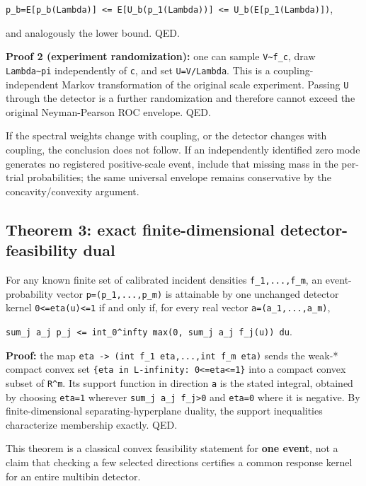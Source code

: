 \documentclass[
  10pt,
  a4paper,
]{article}
\begin{document}
\texttt{p\_b=E{[}p\_b(Lambda){]}\ \textless{}=\ E{[}U\_b(p\_1(Lambda)){]}\ \textless{}=\ U\_b(E{[}p\_1(Lambda){]})},

and analogously the lower bound. QED.

\textbf{Proof 2 (experiment randomization):} one can sample \texttt{V\textasciitilde{}f\_c}, draw \texttt{Lambda\textasciitilde{}pi} independently of \texttt{c}, and set \texttt{U=V/Lambda}. This is a coupling-independent Markov transformation of the original scale experiment. Passing \texttt{U} through the detector is a further randomization and therefore cannot exceed the original Neyman-Pearson ROC envelope. QED.

If the spectral weights change with coupling, or the detector changes with coupling, the conclusion does not follow. If an independently identified zero mode generates no registered positive-scale event, include that missing mass in the per-trial probabilities; the same universal envelope remains conservative by the concavity/convexity argument.

\subsection{Theorem 3: exact finite-dimensional detector-feasibility dual}\label{theorem-3-exact-finite-dimensional-detector-feasibility-dual}

For any known finite set of calibrated incident densities \texttt{f\_1,...,f\_m}, an event-probability vector \texttt{p=(p\_1,...,p\_m)} is attainable by one unchanged detector kernel \texttt{0\textless{}=eta(u)\textless{}=1} if and only if, for every real vector \texttt{a=(a\_1,...,a\_m)},

\texttt{sum\_j\ a\_j\ p\_j\ \textless{}=\ int\_0\^{}infty\ max(0,\ sum\_j\ a\_j\ f\_j(u))\ du}.

\textbf{Proof:} the map \texttt{eta\ -\textgreater{}\ (int\ f\_1\ eta,...,int\ f\_m\ eta)} sends the weak-* compact convex set \texttt{\{eta\ in\ L-infinity:\ 0\textless{}=eta\textless{}=1\}} into a compact convex subset of \texttt{R\^{}m}. Its support function in direction \texttt{a} is the stated integral, obtained by choosing \texttt{eta=1} wherever \texttt{sum\_j\ a\_j\ f\_j\textgreater{}0} and \texttt{eta=0} where it is negative. By finite-dimensional separating-hyperplane duality, the support inequalities characterize membership exactly. QED.

This theorem is a classical convex feasibility statement for \textbf{one event}, not a claim that checking a few selected directions certifies a common response kernel for an entire multibin detector.
\end{document}
